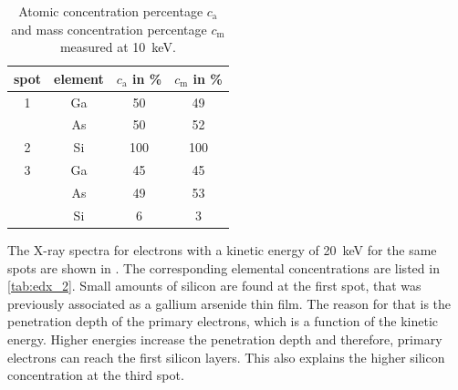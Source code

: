 \begin{table}
	\centering
	\begin{tabular}{cccc}
		\toprule
		spot & element & $c_\mathrm{a}$ in \unit{\percent } & $c_\mathrm{m}$ in \unit{\percent} \\
		\midrule
		1    & Ga      & 50                                 & 49                                \\
		     & As      & 50                                 & 52                                \\
		\midrule
		2    & Si      & 100                                & 100                               \\
		\midrule
		3    & Ga      & 45                                 & 45                                \\
		     & As      & 49                                 & 53                                \\
		     & Si      & 6                                  & 3                                 \\
		\bottomrule
	\end{tabular}
	\caption{Atomic concentration percentage $c_\mathrm{a}$ and mass
		concentration percentage $c_\mathrm{m}$ measured at
		\qty{10}{\kilo\electronvolt}.}
	\label{tab:edx_1}
\end{table}

The X-ray spectra for electrons with a kinetic energy of
\qty{20}{\kilo \electronvolt} for the same spots are shown
in .
The corresponding elemental concentrations are listed in
\cref{tab:edx_2}.
Small amounts of silicon are found at the first spot,
that was previously associated as a gallium arsenide thin film.
The reason for that is the penetration depth of the primary electrons,
which is a function of the kinetic energy.
Higher energies increase the penetration depth and therefore, primary
electrons can reach the first silicon layers.
This also explains the higher silicon concentration at the third spot.

